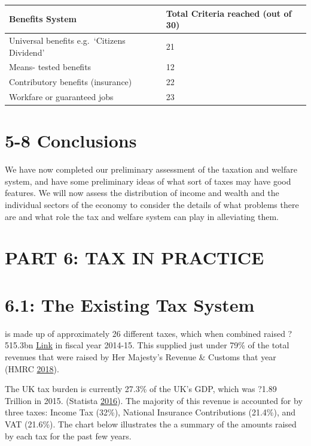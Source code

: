\documentclass[]{tufte-handout}
\begin{document}
\begin{longtable}[]{@{}ll@{}}
\toprule
\textbf{Benefits System} & \textbf{Total Criteria reached (out of
30)}\tabularnewline
\midrule
\endhead
Universal benefits e.g.~`Citizens Dividend' & 21\tabularnewline
Means- tested benefits & 12\tabularnewline
Contributory benefits (insurance) & 22\tabularnewline
Workfare or guaranteed jobs & 23\tabularnewline
\bottomrule
\end{longtable}

\hypertarget{conclusions}{%
\section{5-8 Conclusions}\label{conclusions}}

We have now completed our preliminary assessment of the taxation and
welfare system, and have some preliminary ideas of what sort of taxes
may have good features. We will now assess the distribution of income
and wealth and the individual sectors of the economy to consider the
details of what problems there are and what role the tax and welfare
system can play in alleviating them.

\newpage

\hypertarget{part-6-tax-in-practice}{%
\section{PART 6: TAX IN PRACTICE}\label{part-6-tax-in-practice}}

\hypertarget{the-existing-tax-system}{%
\section{6.1: The Existing Tax System}\label{the-existing-tax-system}}

 is made up of approximately 26 different
taxes, which when combined raised ?515.3bn
\href{https://www.statista.com/statistics/284298/total-united-kingdom-hmrc-tax-receipts/\#0}{Link}
in fiscal year 2014-15. This supplied just under 79\% of the total
revenues that were raised by Her Majesty's Revenue \& Customs that year
(HMRC \protect\hyperlink{ref-HMRC2018a}{2018}).

The UK tax burden is currently 27.3\% of the UK's GDP, which was ?1.89
Trillion in 2015. (Statista \protect\hyperlink{ref-Statista2016}{2016}).
The majority of this revenue is accounted for by three taxes: Income Tax
(32\%), National Insurance Contributions (21.4\%), and VAT (21.6\%). The
chart below illustrates the a summary of the amounts raised by each tax
for the past few years.
\end{document}
